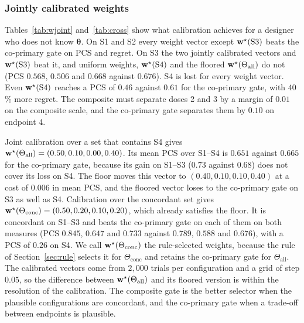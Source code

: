 \begin{table}
\centering\footnotesize
\caption{Jointly calibrated weights over a scenario set $\Theta$ ($n_1=100$, $\rho=0.3$), with the mean PCS over $\Theta$ of the composite and co-primary gates.}\label{tab:wjoint}

\end{table}

\begin{table}
\centering\footnotesize
\caption{PCS and expected regret at $n_1=100$ and $\rho=0.3$ for the co-primary gate and for the composite gate with each weight vector.}\label{tab:cross}

\end{table}

\subsubsection{Jointly calibrated weights}
Tables~\ref{tab:wjoint} and~\ref{tab:cross} show what calibration achieves for a designer who does not know $\bm\theta$. On S1 and S2 every weight vector except $\mathbf{w}^\star(\mathrm{S3})$ beats the co-primary gate on PCS and regret. On S3 the two jointly calibrated vectors and $\mathbf{w}^\star(\mathrm{S3})$ beat it, and uniform weights, $\mathbf{w}^\star(\mathrm{S4})$ and the floored $\mathbf{w}^\star(\Theta_{\mathrm{all}})$ do not (PCS $0.568$, $0.506$ and $0.668$ against $0.676$). S4 is lost for every weight vector. Even $\mathbf{w}^\star(\mathrm{S4})$ reaches a PCS of $0.46$ against $0.61$ for the co-primary gate, with $40$\% more regret. The composite must separate doses 2 and 3 by a margin of $0.01$ on the composite scale, and the co-primary gate separates them by $0.10$ on endpoint 4.

Joint calibration over a set that contains S4 gives $\mathbf{w}^\star(\Theta_{\mathrm{all}})=(0.50,0.10,0.00,0.40)$. Its mean PCS over S1--S4 is $0.651$ against $0.665$ for the co-primary gate, because its gain on S1--S3 ($0.73$ against $0.68$) does not cover its loss on S4. The floor moves this vector to $(0.40,0.10,0.10,0.40)$ at a cost of $0.006$ in mean PCS, and the floored vector loses to the co-primary gate on S3 as well as S4. Calibration over the concordant set gives $\mathbf{w}^\star(\Theta_{\mathrm{conc}})=(0.50,0.20,0.10,0.20)$, which already satisfies the floor. It is concordant on S1--S3 and beats the co-primary gate on each of them on both measures (PCS $0.845$, $0.647$ and $0.733$ against $0.789$, $0.588$ and $0.676$), with a PCS of $0.26$ on S4. We call $\mathbf{w}^\star(\Theta_{\mathrm{conc}})$ the rule-selected weights, because the rule of Section~\ref{sec:rule} selects it for $\Theta_{\mathrm{conc}}$ and retains the co-primary gate for $\Theta_{\mathrm{all}}$. The calibrated vectors come from $2{,}000$ trials per configuration and a grid of step $0.05$, so the difference between $\mathbf{w}^\star(\Theta_{\mathrm{all}})$ and its floored version is within the resolution of the calibration. The composite gate is the better selector when the plausible configurations are concordant, and the co-primary gate when a trade-off between endpoints is plausible.

